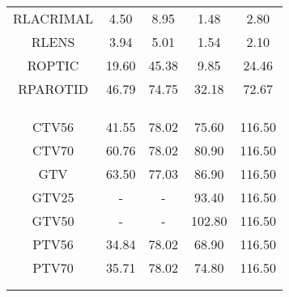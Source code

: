 \begin{sidewaystable}[p]
{\begin{tabular}{ccccc}
RLACRIMAL & 4.50 & 8.95 & 1.48 & 2.80 \\
RLENS & 3.94 & 5.01 & 1.54 & 2.10 \\
ROPTIC & 19.60 & 45.38 & 9.85 & 24.46 \\
RPAROTID & 46.79 & 74.75 & 32.18 & 72.67 \\\\\\
\bottomrule\\       
CTV56 & 41.55 & 78.02 & 75.60 & 116.50 \\
CTV70 & 60.76 & 78.02 & 80.90 & 116.50 \\
GTV & 63.50 & 77.03 & 86.90 & 116.50 \\
GTV25 & - & - & 93.40 & 116.50 \\
GTV50 & - & - & 102.80 & 116.50 \\
PTV56 & 34.84 & 78.02 & 68.90 & 116.50 \\
PTV70 & 35.71 & 78.02 & 74.80 & 116.50 \\\\
 \bottomrule\\
 \end{tabular}
}
\end{sidewaystable}